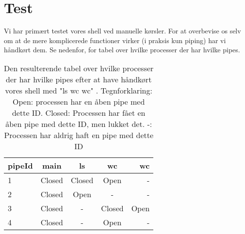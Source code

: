 \section{Test}
Vi har primært testet vores shell ved manuelle kørsler. For at overbevise os selv om at de mere komplicerede functioner virker (i praksis kun piping) har vi håndkørt dem. Se nedenfor, for tabel over hvilke processer der har hvilke pipes. 

\begin{table}[]
\centering
\begin{tabular}{ l | c | c | c | r}
pipeId & main & ls & wc & wc \\ \hline
1 & Closed & Closed & Open & - \\ \hline
2 & Closed & Open & - & - \\ \hline
3 & Closed & - & Closed & Open\\ \hline
4 & Closed & - & Open &  -
\end{tabular}
\caption{Den resulterende tabel over hvilke processer der har hvilke pipes efter at have håndkørt vores shell med "ls \textbar wc \textbar wc" .
\newline
Tegnforklaring: Open: processen har en åben pipe med dette ID. Closed: Processen har fået en åben pipe med dette ID, men lukket det. -: Processen har aldrig haft en pipe med dette ID}
\label{test-tabel}
\end{table}
